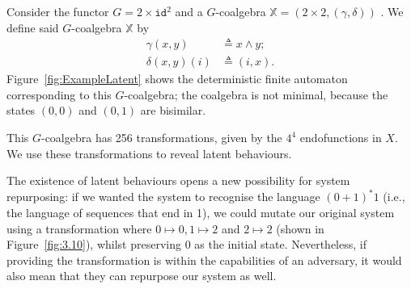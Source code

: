 \begin{example}
\label{ex:LatentBehaviour}
Consider the functor $G=2\times \texttt{id}^2$ and a $G$-coalgebra $\mathbb{X}=(2\times2,(\gamma,\delta))$ 
. We define said $G$-coalgebra $\mathbb{X}$ by
\begin{align}
\gamma(x,y)&\triangleq x \land y;\\
\delta(x,y)(i)&\triangleq(i,x).
\end{align}
Figure~\ref{fig:ExampleLatent} shows the deterministic finite automaton corresponding to this $G$-coalgebra; the coalgebra is not minimal, because the states $(0,0)$ and $(0,1)$ are bisimilar.

This $G$-coalgebra has 256 transformations, given by the $4^4$ endofunctions in $X$. We use these transformations to reveal latent behaviours.%

{\color{red}
The existence of latent behaviours opens a new possibility for system repurposing: if we wanted the system to recognise the language $(0+1)^*1$ (i.e., the language of sequences that end in 1), we could mutate our original system using a transformation where $0\mapsto0, 1\mapsto2$ and $2\mapsto2$ (shown in Figure~\ref{fig:3.10}), whilst preserving $0$ as the initial state. Nevertheless, if providing the transformation is within the capabilities of an adversary, it would also mean that they can repurpose our system as well. 
}



\end{example}
